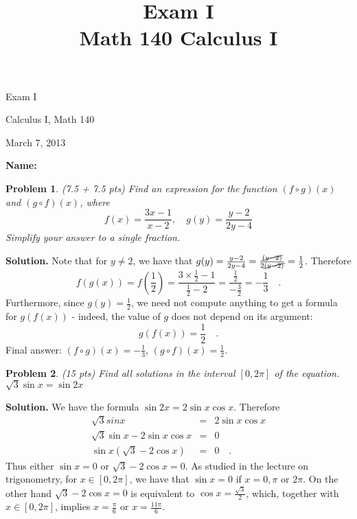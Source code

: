 \documentclass{article}
\date{}
\title{Exam I\\ Math 140 Calculus I }
\newtheorem{problem}{Problem}
\begin{document}
\begin{center}
\LARGE
Exam I 

Calculus I, Math 140

March 7, 2013
\end{center}

\noindent \textbf{Name:}
\medskip

\begin{problem}
(7.5 + 7.5 pts) Find an expression for the function $(f\circ g)(x)$ and $(g\circ f)(x)$, where 
\[
f(x)= \frac{3x-1}{x-2},\quad  g(y)=\frac{y-2 }{2y-4}
\] Simplify your answer to a single fraction.
\end{problem}
\textbf{Solution. } 
Note that for $y\neq 2$, we have that $g(y)= \frac{y-2}{2y-4}= \frac{\cancel{(y-2)}}{2\cancel{(y-2)}}= \frac{1}{2}$. Therefore
\[
f(g(x))=f(\frac{1}{2})= \frac{3\times\frac{1}{2}-1}{\frac{1}{2}-2}= \frac{\frac{1}2}{-\frac{3}2}= -\frac{1}3\quad .
\]
Furthermore, since $g(y)=\frac{1}{2}$, we need not compute anything to get a formula for $g(f(x))$ - indeed, the value of $g$ does not depend on its argument:
\[
g(f(x))=\frac{1}{2}\quad .
\]
Final answer: $(f\circ g) (x)=-\frac{1}{3}$, $(g\circ f)(x)=\frac{1}2$.
\begin{problem} (15 pts)
Find all solutions in the interval $[0,2\pi]$ of the equation.
$\sqrt{ 3}\sin x=  \sin 2x$
\end{problem}
\textbf{Solution. } 
We have the formula $\sin 2x=2\sin x \cos x $. Therefore 
\[\begin{array}{rcl}
\sqrt{3} sin x&=& 2\sin x \cos x\\
\sqrt{3}\sin x - 2\sin x \cos x &=& 0\\
\sin x (\sqrt{3}- 2\cos x)&=&0\quad .
\end{array}
\]
Thus either $\sin x =0$ or $\sqrt{3}- 2\cos x=0$. As studied in the lecture on trigonometry, for $x\in [0,2\pi]$, we have that $\sin x=0$ 
if $x=0,\pi$ or $2\pi$. On the other hand $\sqrt 3-2\cos x=0$ is equivalent to $\cos x=\frac{\sqrt{3}}{2}$, which, together with $x\in [0,2\pi]$, implies $x=\frac{\pi}{6} $ or $x=\frac{11\pi}{6}$.
\end{document}
